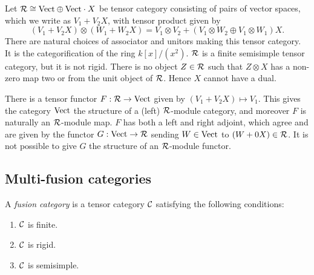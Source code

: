 \documentclass{amsart}
\begin{document}
\begin{example}
	Let $\mathcal R \cong \mathrm{Vect} \oplus \mathrm{Vect} \cdot X$ be tensor category consisting of pairs of vector spaces, which we write as $V_1 + V_2 X$, with tensor product given by 
	\begin{equation*}
		(V_1 + V_2 X) \otimes (W_1 + W_2 X) = V_1 \otimes V_2  +  (V_1 \otimes W_2 \oplus V_1 \otimes W_1)X.
	\end{equation*} 
	There are natural choices of associator and unitors making this tensor category. It is the categorification of the ring $k[x]/(x^2)$. $\mathcal R$ is a finite semisimple tensor category, but it is not rigid. There is no object $Z \in \mathcal R$ such that $Z \otimes X$ has a non-zero map two or from the unit object of $\mathcal R$. Hence $X$ cannot have a dual. 
	
	There is a tensor functor $F:\mathcal R \to \mathrm{Vect}$ given by $(V_1 + V_2 X) \mapsto V_1$. This gives the category $\mathrm{Vect}$ the structure of a (left) $\mathcal R$-module category, and moreover $F$ is naturally an $\mathcal R$-module map. $F$ has both a left and right adjoint, which agree and are given by the functor $G: \mathrm{Vect} \to \mathcal R$ sending $W \in \mathrm{Vect}$ to $(W + 0 X) \in \mathcal R$. It is not possible to give $G$ the structure of an $\mathcal R$-module functor. 
\end{example}

\subsection{Multi-fusion categories} \label{sec-tc-fusion}



\begin{definition}
A \emph{fusion category} is a tensor category $\mathcal C$ satisfying the following conditions:
\begin{enumerate}
\item $\mathcal C$ is finite. %
\item $\mathcal C$ is rigid. 
\item $\mathcal C$ is semisimple. 
\end{enumerate}
\end{definition}
\end{document}
